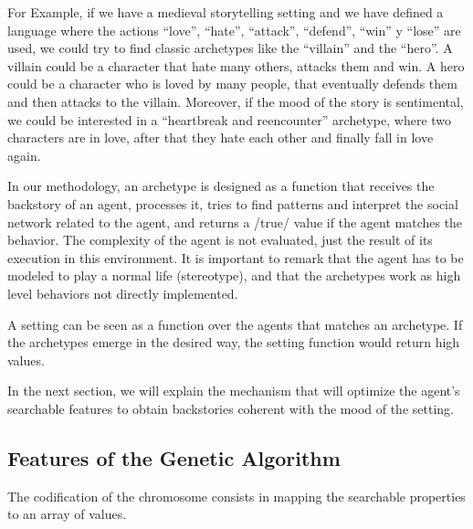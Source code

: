 \documentclass[letterpaper]{article}
\begin{document}
For Example, if we have a medieval storytelling setting and we have defined a language where the actions ``love'', ``hate'', ``attack'', ``defend'', ``win'' y ``lose'' are used, we could try to find classic 
archetypes like the ``villain'' and the ``hero''. A villain could be a character that hate many others, attacks them and win. A hero could be a character who is loved by many people, that eventually defends them and then attacks to the villain. Moreover, if the mood of the story is sentimental, we could be interested in a ``heartbreak and reencounter'' archetype, where two characters are in love, after that they hate each other and finally fall in love again.

In our methodology, an archetype is designed as a function that receives the backstory of an agent, processes it, tries to find patterns and interpret the social network related to the agent, and returns a /true/ value if the agent matches the behavior. 
The complexity of the agent is not evaluated, just the result of its execution in this environment. It is important to remark that the agent has to be modeled to play a normal life (stereotype), and that the archetypes work as high level behaviors not directly implemented.

A setting can be seen as a function over the agents that matches an archetype. If the archetypes emerge in the desired way, the setting function would return high values.

In the next section, we will explain the mechanism that will optimize the agent's searchable features to obtain backstories coherent with the mood of the setting.

\subsection{Features of the Genetic Algorithm}


The codification of the chromosome consists in mapping the searchable properties to an array of values. %
\end{document}
